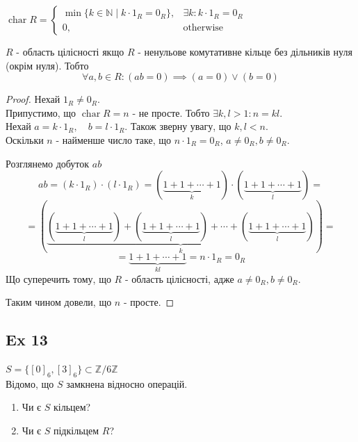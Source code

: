 \documentclass[11pt, a4paper]{article} %
\newcommand{\N}{\mathbb{N}}
\newcommand{\Z}{\mathbb{Z}}
\DeclareMathOperator{\ch}{char}
\begin{document}
$\ch R = \begin{cases}
    \min \{k\in\N \mid k\cdot 1_R = 0_R\}, & \exists k: k\cdot 1_R = 0_R\\
    0, & \text{otherwise}
\end{cases} $

$R$ - область цілісності якщо $R$ - ненульове комутативне кільце без дільників нуля (окрім нуля).
Тобто
\[\forall a,b\in R: (ab=0) \implies (a=0) \vee (b=0)\]

\begin{proof}
    Нехай $1_R \ne 0_R$. \\
    Припустимо, що $\ch R = n$ - не просте. 
    Тобто $\exists k,l>1: n = kl$.\\
    Нехай $a = k\cdot 1_R, \quad b = l\cdot 1_R$.
    Також зверну увагу, що $k,l < n$.\\
    Оскільки $n$ - найменше число таке, що $n\cdot 1_R=0_R$, $a\ne 0_R, b\ne 0_R$.

    Розглянемо добуток $ab$
    \[ab = (k\cdot 1_R) \cdot (l \cdot 1_R) = (\underset{k}{\underbrace{1+1+\cdots+1}}) \cdot (\underset{l}{\underbrace{1+1+\cdots+1}}) = \]
    \[= \left(\underset{k}{\underbrace{(\underset{l}{\underbrace{1+1+\cdots+1}}) + (\underset{l}{\underbrace{1+1+\cdots+1}}) + \cdots + (\underset{l}{\underbrace{1+1+\cdots+1}})}}\right) = \]
    \[= \underset{kl}{\underbrace{1+1+\cdots+1}} = n\cdot 1_R = 0_R\]
    Що суперечить тому, що $R$ - область цілісності, адже $a\ne0_R, b\ne0_R$.

    Таким чином довели, що $n$ - просте.
\end{proof}

\newpage
\subsection*{Ex 13}
\begin{mdframed}
    $S = \{[0]_6, [3]_6\} \subset \Z/6\Z$\\
    Відомо, що $S$ замкнена відносно операцій.
    \begin{enumerate}
        \item Чи є $S$ кільцем?
        \item Чи є $S$ підкільцем $R$?
    \end{enumerate}
\end{mdframed}
\end{document}

